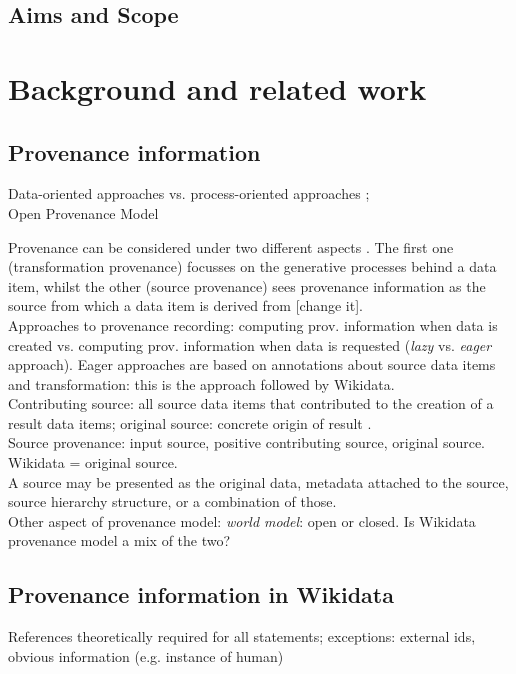 \documentclass{llncs}
\begin{document}
\subsection{Aims and Scope}


%
\section{Background and related work}
%
\subsection{Provenance information}
Data-oriented approaches vs. process-oriented approaches \cite{hartig};\\
Open Provenance Model \cite{moreau}

Provenance can be considered under two different aspects \cite{DBLP:conf/btw/GlavicD07}. The first one (transformation provenance) focusses on the generative processes behind a data item, whilst the other (source provenance) sees provenance information as the source from which a data item is derived from [change it].\\
Approaches to provenance recording: computing prov. information when data is created vs. computing prov. information when data is requested (\textit{lazy} vs. \textit{eager} approach). Eager approaches are based on annotations about source data items and transformation: this is the approach followed by Wikidata.\\
Contributing source: all source data items that contributed to the creation of a result data items; original source: concrete origin of result \cite{DBLP:conf/btw/GlavicD07}.\\
Source provenance: input source, positive contributing source, original source. Wikidata = original source.\\
A source may be presented as the original data, metadata attached to the source, source hierarchy structure, or a combination of those. \\
Other aspect of provenance model: \textit{world model}: open or closed. Is Wikidata provenance model a mix of the two?

\subsection{Provenance information in Wikidata}
References theoretically required for all statements; exceptions: external ids, obvious information (e.g. instance of human)
\end{document}
